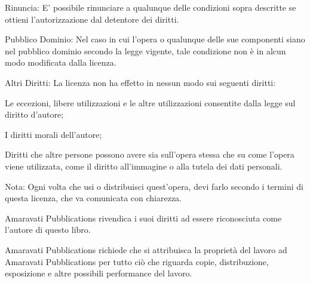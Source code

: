 {\begin{packeditemize}
\item Rinuncia: E' possibile rinunciare a qualunque delle condizioni sopra descritte se ottieni l'autorizzazione dal detentore dei diritti.
\item Pubblico Dominio: Nel caso in cui l'opera o qualunque delle sue componenti siano nel pubblico dominio secondo la legge vigente, tale condizione non è in alcun modo modificata dalla licenza.
\item Altri Diritti: La licenza non ha effetto in nessun modo sui seguenti diritti:
\begin{packeditemize}
\item Le eccezioni, libere utilizzazioni e le altre utilizzazioni consentite dalla legge sul diritto d'autore;
\item I diritti morali dell'autore;
\item Diritti che altre persone possono avere sia sull'opera stessa che su come l'opera viene utilizzata, come il diritto all'immagine o alla tutela dei dati personali.
\end{packeditemize}
\item Nota: Ogni volta che usi o distribuisci quest'opera, devi farlo secondo i termini di questa licenza, che va comunicata con chiarezza.
\end{packeditemize}

Amaravati Pubblications rivendica i suoi diritti ad essere riconosciuta come l'autore di questo libro.

Amaravati Pubblications richiede che si attribuisca la proprietà del lavoro ad Amaravati Pubblications per tutto ciò che riguarda copie, distribuzione, esposizione e altre possibili performance del lavoro.

}
